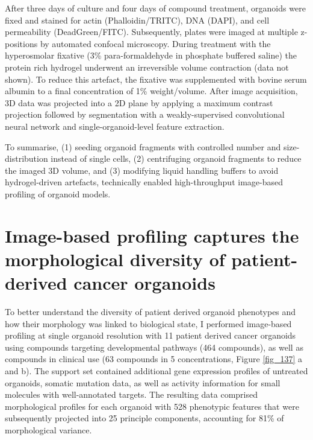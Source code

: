 \begin{flushleft}
After three days of culture and four days of compound treatment, organoids were fixed and stained for actin (Phalloidin/TRITC), DNA (DAPI), and cell permeability (DeadGreen/FITC). Subsequently, plates were imaged at multiple z-positions by automated confocal microscopy. During treatment with the hyperosmolar fixative (3\% para-formaldehyde in phosphate buffered saline) the protein rich hydrogel underwent an irreversible volume contraction (data not shown). To reduce this artefact, the fixative was supplemented with bovine serum albumin to a final concentration of 1\% weight/volume. After image acquisition, 3D data was projected into a 2D plane by applying a maximum contrast projection followed by segmentation with a weakly-supervised convolutional neural network and single-organoid-level feature extraction.
\par
To summarise, (1) seeding organoid fragments with controlled number and size-distribution instead of single cells, (2) centrifuging organoid fragments to reduce the imaged 3D volume, and (3) modifying liquid handling buffers to avoid hydrogel-driven artefacts, technically enabled high-throughput image-based profiling of organoid models. 
\bigbreak

\section{Image-based profiling captures the morphological diversity of patient-derived cancer organoids}
To better understand the diversity of patient derived organoid phenotypes and how their morphology was linked to biological state, I performed image-based profiling at single organoid resolution with 11 patient derived cancer organoids using compounds targeting developmental pathways (464 compounds), as well as compounds in clinical use (63 compounds in 5 concentrations, Figure \ref{fig_137} a and b). The support set contained additional gene expression profiles of untreated organoids, somatic mutation data, as well as activity information for small molecules with well-annotated targets. The resulting data comprised morphological profiles for each organoid with 528 phenotypic features that were subsequently projected into 25 principle components, accounting for 81\% of morphological variance. 


\end{flushleft}
